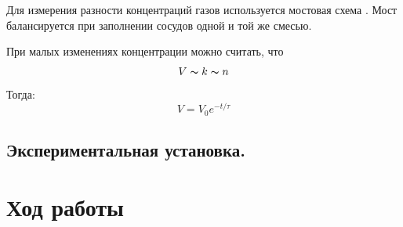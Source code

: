 \documentclass[a4paper,12pt]{article}
\numberwithin{equation}{section}
\begin{document}
Для измерения разности концентраций газов используется мостовая схема .
Мост балансируется при заполнении сосудов одной и той же смесью.

При малых изменениях концентрации можно считать, что \[ V \thicksim k \thicksim n \]
Тогда: 
\begin{equation}
  V = V_0 e^{-t/\tau} \label{eq:V}
\end{equation}

\subsection{Экспериментальная установка.}


\section{Ход работы}
\end{document}
